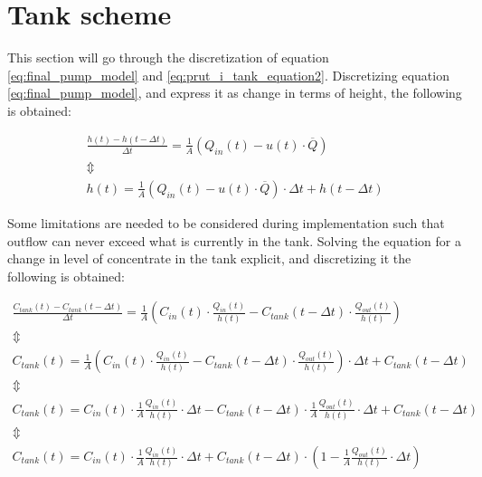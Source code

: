 \section{Tank scheme}\label{sec:tank}

This section will go through the discretization of equation \ref{eq:final_pump_model} and \ref{eq:prut_i_tank_equation2}.
Discretizing equation \ref{eq:final_pump_model}, and express it as change in terms of height, the following is obtained:

\begin{equation}\label{eq:disc_tank}
\begin{array}{l}
	\frac{h(t)-h(t-\Delta t)}{\Delta t} = \frac{1}{A} (Q_{in}(t) - u(t)\cdot \overline Q) \\
	\Updownarrow \\
	h(t) = \frac{1}{A} (Q_{in}(t) - u(t)\cdot \overline Q) \cdot \Delta t + h(t-\Delta t)	
\end{array}
\end{equation}

Some limitations are needed to be considered during implementation such that outflow can never exceed what is currently in the tank.
Solving the equation for a change in level of concentrate in the tank explicit, and discretizing it the following is obtained:

\begin{equation}\label{eq:disc_con_tank}
\begin{array}{l}
	\frac{C_{tank}(t)-C_{tank}(t-\Delta t)}{\Delta t} = \frac{1}{A} \left(C_{in}(t) \cdot \frac{Q_{in}(t)}{h(t)} - C_{tank}(t - \Delta t) \cdot \frac{Q_{out}(t)}{h(t)} \right) \\
	
	\Updownarrow \\
	
	C_{tank}(t) = \frac{1}{A} \left(C_{in}(t) \cdot \frac{Q_{in}(t)}{h(t)} - C_{tank}(t - \Delta t) \cdot \frac{Q_{out}(t)}{h(t)} \right) \cdot \Delta t + C_{tank}(t-\Delta t) \\

	\Updownarrow \\

	C_{tank}(t) =  C_{in}(t) \cdot \frac{1}{A} \frac{Q_{in}(t)}{h(t)} \cdot \Delta t -  C_{tank}(t - \Delta t) \cdot \frac{1}{A} \frac{Q_{out}(t)}{h(t)} \cdot \Delta t + C_{tank}(t - \Delta t) \\

	\Updownarrow \\

	C_{tank}(t) =   C_{in}(t) \cdot \frac{1}{A} \frac{Q_{in}(t)}{h(t)} \cdot \Delta t +  C_{tank}(t - \Delta t) \cdot \left( 1 - \frac{1}{A} \frac{Q_{out}(t)}{h(t)} \cdot \Delta t \right)

\end{array}
\end{equation}


